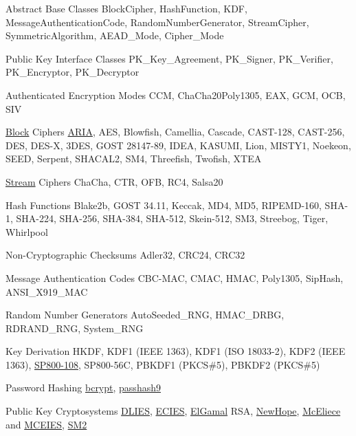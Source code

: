 
\begin{DoxyDescription}
\item[Abstract Base Classes]Block\+Cipher, Hash\+Function, K\+DF, Message\+Authentication\+Code, Random\+Number\+Generator, Stream\+Cipher, Symmetric\+Algorithm, A\+E\+A\+D\+\_\+\+Mode, Cipher\+\_\+\+Mode 
\item[Public Key Interface Classes]P\+K\+\_\+\+Key\+\_\+\+Agreement, P\+K\+\_\+\+Signer, P\+K\+\_\+\+Verifier, P\+K\+\_\+\+Encryptor, P\+K\+\_\+\+Decryptor 
\item[Authenticated Encryption Modes]C\+CM, Cha\+Cha20\+Poly1305, E\+AX, G\+CM, O\+CB, S\+IV 
\item[\mbox{\hyperlink{struct_block}{Block}} Ciphers]\mbox{\hyperlink{aria_8h_source}{A\+R\+IA}}, A\+ES, Blowfish, Camellia, Cascade, C\+A\+S\+T-\/128, C\+A\+S\+T-\/256, D\+ES, D\+E\+S-\/X, 3\+D\+ES, G\+O\+ST 28147-\/89, I\+D\+EA, K\+A\+S\+U\+MI, Lion, M\+I\+S\+T\+Y1, Noekeon, S\+E\+ED, Serpent, S\+H\+A\+C\+A\+L2, S\+M4, Threefish, Twofish, X\+T\+EA 
\item[\mbox{\hyperlink{struct_stream}{Stream}} Ciphers]Cha\+Cha, C\+TR, O\+FB, R\+C4, Salsa20 
\item[Hash Functions]Blake2b, G\+O\+ST 34.11, Keccak, M\+D4, M\+D5, R\+I\+P\+E\+M\+D-\/160, S\+H\+A-\/1, S\+H\+A-\/224, S\+H\+A-\/256, S\+H\+A-\/384, S\+H\+A-\/512, Skein-\/512, S\+M3, Streebog, Tiger, Whirlpool 
\item[Non-\/\+Cryptographic Checksums]Adler32, C\+R\+C24, C\+R\+C32 
\item[Message Authentication Codes]C\+B\+C-\/\+M\+AC, C\+M\+AC, H\+M\+AC, Poly1305, Sip\+Hash, A\+N\+S\+I\+\_\+\+X919\+\_\+\+M\+AC 
\item[Random Number Generators]Auto\+Seeded\+\_\+\+R\+NG, H\+M\+A\+C\+\_\+\+D\+R\+BG, R\+D\+R\+A\+N\+D\+\_\+\+R\+NG, System\+\_\+\+R\+NG 
\item[Key Derivation]H\+K\+DF, K\+D\+F1 (I\+E\+EE 1363), K\+D\+F1 (I\+SO 18033-\/2), K\+D\+F2 (I\+E\+EE 1363), \mbox{\hyperlink{sp800__108_8h_source}{S\+P800-\/108}}, S\+P800-\/56C, P\+B\+K\+D\+F1 (P\+K\+CS\#5), P\+B\+K\+D\+F2 (P\+K\+CS\#5) 
\item[Password Hashing]\mbox{\hyperlink{bcrypt_8h_source}{bcrypt}}, \mbox{\hyperlink{passhash9_8h_source}{passhash9}} 
\item[Public Key Cryptosystems]\mbox{\hyperlink{dlies_8h_source}{D\+L\+I\+ES}}, \mbox{\hyperlink{ecies_8h_source}{E\+C\+I\+ES}}, \mbox{\hyperlink{elgamal_8h_source}{El\+Gamal}} R\+SA, \mbox{\hyperlink{newhope_8h_source}{New\+Hope}}, \mbox{\hyperlink{mceliece_8h_source}{Mc\+Eliece}} and \mbox{\hyperlink{mceies_8h_source}{M\+C\+E\+I\+ES}}, \mbox{\hyperlink{sm2_8h_source}{S\+M2}} 

\end{DoxyDescription}
